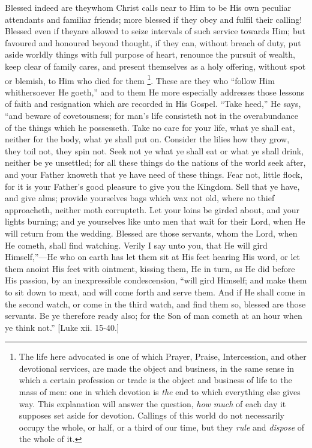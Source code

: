 Blessed indeed are they\emph{}whom Christ calls near to Him to be
His own peculiar attendants and familiar friends; more blessed if they
obey and fulfil their calling! Blessed even if they\emph{}are allowed
to seize intervals of such service towards Him; but favoured and
honoured beyond thought, if they can, without breach of duty, put
aside worldly things with full purpose of heart, renounce the pursuit
of wealth, keep clear of family cares, and present themselves as a
holy offering, without spot or blemish, to Him who died for them \footnote{The life here advocated is one of which
Prayer, Praise, Intercession, and other devotional services, are made
the object and business, in the same sense in which a certain
profession or trade is the object and business of life to the mass of
men: one in which devotion is \emph{the} end to which everything else
gives way. This explanation will answer the question, \emph{how much}
of each day it supposes set aside for devotion. Callings of this world
do not necessarily occupy the whole, or half, or a third of our time,
but they \emph{rule} and \emph{dispose} of the whole of it.}. These are they who ``follow Him whithersoever He goeth,''
and to them He more especially addresses those lessons of faith and
resignation which are recorded in His Gospel. ``Take heed,''
He says, ``and beware of covetousness; for man's life consisteth
not in the overabundance of the things which he possesseth. Take no
care for your life, what ye shall eat, neither for the body, what ye
shall put on. Consider the lilies how they grow, they toil not, they
spin not. Seek not ye what ye shall eat or what ye shall drink,
neither be ye unsettled; for all these things do the nations of the
world seek after, and your Father knoweth that ye have need of these
things. Fear not, little flock, for it is your Father's good
pleasure to give you the Kingdom. Sell that ye have, and give alms;
provide yourselves bags which wax not old, where no thief approacheth,
neither moth corrupteth. Let your loins be girded about, and your
lights burning; and ye yourselves like unto men that wait for their
Lord, when He will return from the wedding. Blessed are those
servants, whom the Lord, when He cometh, shall find watching. Verily
I
say unto you, that He will gird Himself,''—He who on earth has
let them sit at His feet hearing His word, or let them anoint His feet
with ointment, kissing them, He in turn, as He did before His passion,
by an inexpressible condescension, ``will gird Himself; and make
them to sit down to meat, and will come forth and serve them. And if
He shall come in the second watch, or come in the third watch, and
find them so, blessed are those servants. Be ye therefore ready also;
for the Son of man cometh at an hour when ye think not.'' [Luke
xii. 15-40.]

